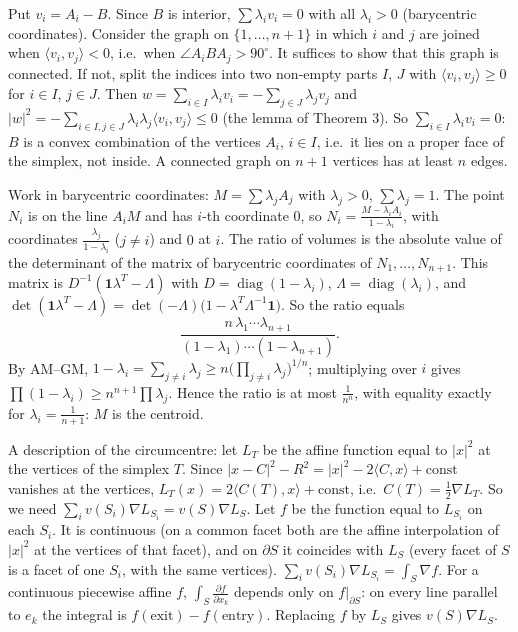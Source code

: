 \documentclass[11pt,a4paper]{article}
\begin{document}
 Put $v_i=A_i-B$. Since $B$ is interior, $\sum\lambda_iv_i=0$ with all $\lambda_i>0$ (barycentric coordinates). Consider the graph on $\{1,\dots,n+1\}$ in which $i$ and $j$ are joined when $\langle v_i,v_j\rangle<0$, i.e.\ when $\angle A_iBA_j>90^\circ$. It suffices to show that this graph is connected.
 If not, split the indices into two non-empty parts $I$, $J$ with $\langle v_i,v_j\rangle\ge0$ for $i\in I$, $j\in J$. Then $w=\sum_{i\in I}\lambda_iv_i=-\sum_{j\in J}\lambda_jv_j$ and $|w|^2=-\sum_{i\in I,j\in J}\lambda_i\lambda_j\langle v_i,v_j\rangle\le0$ (the lemma of Theorem 3).
 So $\sum_{i\in I}\lambda_iv_i=0$: $B$ is a convex combination of the vertices $A_i$, $i\in I$, i.e.\ it lies on a proper face of the simplex, not inside. A connected graph on $n+1$ vertices has at least $n$ edges.

 Work in barycentric coordinates: $M=\sum\lambda_jA_j$ with $\lambda_j>0$, $\sum\lambda_j=1$. The point $N_i$ is on the line $A_iM$ and has $i$-th coordinate $0$, so $N_i=\frac{M-\lambda_iA_i}{1-\lambda_i}$, with coordinates $\frac{\lambda_j}{1-\lambda_i}$ ($j\ne i$) and $0$ at $i$.
 The ratio of volumes is the absolute value of the determinant of the matrix of barycentric coordinates of $N_1,\dots,N_{n+1}$. This matrix is $D^{-1}(\mathbf1\lambda^T-\Lambda)$ with $D=\operatorname{diag}(1-\lambda_i)$, $\Lambda=\operatorname{diag}(\lambda_i)$, and $\det(\mathbf1\lambda^T-\Lambda)=\det(-\Lambda)\bigl(1-\lambda^T\Lambda^{-1}\mathbf1\bigr)$. So the ratio equals
\[\frac{n\,\lambda_1\cdots\lambda_{n+1}}{(1-\lambda_1)\cdots(1-\lambda_{n+1})}.\]
 By AM--GM, $1-\lambda_i=\sum_{j\ne i}\lambda_j\ge n\bigl(\prod_{j\ne i}\lambda_j\bigr)^{1/n}$; multiplying over $i$ gives $\prod(1-\lambda_i)\ge n^{n+1}\prod\lambda_j$. Hence the ratio is at most $\frac1{n^n}$, with equality exactly for $\lambda_i=\frac1{n+1}$: $M$ is the centroid.

 A description of the circumcentre: let $L_T$ be the affine function equal to $|x|^2$ at the vertices of the simplex $T$. Since $|x-C|^2-R^2=|x|^2-2\langle C,x\rangle+\mathrm{const}$ vanishes at the vertices, $L_T(x)=2\langle C(T),x\rangle+\mathrm{const}$, i.e.\ $C(T)=\frac12\nabla L_T$. So we need $\sum_iv(S_i)\nabla L_{S_i}=v(S)\nabla L_S$.
 Let $f$ be the function equal to $L_{S_i}$ on each $S_i$. It is continuous (on a common facet both are the affine interpolation of $|x|^2$ at the vertices of that facet), and on $\partial S$ it coincides with $L_S$ (every facet of $S$ is a facet of one $S_i$, with the same vertices).
 $\sum_iv(S_i)\nabla L_{S_i}=\int_S\nabla f$. For a continuous piecewise affine $f$, $\int_S\frac{\partial f}{\partial x_k}$ depends only on $f|_{\partial S}$: on every line parallel to $e_k$ the integral is $f(\text{exit})-f(\text{entry})$. Replacing $f$ by $L_S$ gives $v(S)\nabla L_S$.
\end{document}
